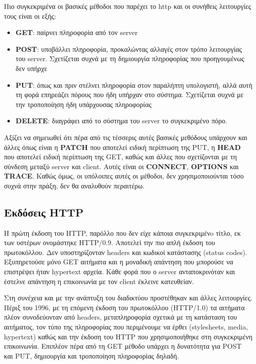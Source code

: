 Πιο συγκεκριμένα οι βασικές μέθοδοι που παρέχει το http και οι συνήθεις λειτουργίες τους είναι οι εξής:

\begin{itemize}
	\item \textbf{GET}: παίρνει πληροφορία από τον server
	\item \textbf{POST}: υποβάλλει πληροφορία, προκαλώντας αλλαγές στον τρόπο λειτουργίας του server. Σχετίζεται συχνά με τη δημιουργία πληροφορίας που προηγουμένως δεν υπήρχε 
	\item \textbf{PUT}: όπως και πριν στέλνει πληροφορία στον παραλήπτη υπολογιστή, αλλά αυτή τη φορά επηρεάζει πόρους που ήδη υπήρχαν στο σύστημα. Σχετίζεται συχνά με την τροποποίηση ήδη υπάρχουσας πληροφορίας
	\item \textbf{DELETE}: διαγράφει από το σύστημα του server το συγκεκριμένο πόρο.
\end{itemize}

Αξίζει να σημειωθεί ότι πέρα από τις τέσσερις αυτές βασικές μεθόδους υπάρχουν και άλλες όπως είναι 
η \textbf{PATCH} που αποτελεί ειδική περίπτωση της PUT, η \textbf{HEAD} που αποτελεί ειδική περίπτωση της GET,
καθώς και άλλες που σχετίζονται με τη σύνδεση μεταξύ server και client. Αυτές είναι οι \textbf{CONNECT}, \textbf{OPTIONS} και \textbf{TRACE}.
Καθώς όμως, οι υπόλοιπες αυτές οι μέθοδοι, δεν χρησιμοποιούνται τόσο συχνά στην πράξη, δεν θα αναλυθούν περαιτέρω.

\subsection{Εκδόσεις HTTP}
\label{subsec:http_versions}

Η πρώτη έκδοση του HTTP, παρόλλο που δεν είχε κάποια συγκεκριμένo τίτλο, εκ των υστέρων ονομάστηκε 
HTTP/0.9. Αποτελεί την πιο απλή έκδοση του πρωτοκόλλου. Δεν υποστηρίζονταν headers και κωδικοί κατάστασης (status codes).
Εξυπηρετούσε μόνο GET αιτήματα και η μοναδική απάντηση που μπορούσε να επιστρέψει ήταν hypertext αρχεία. Kάθε φορά που ο server ανταποκρινόταν και έστελνε
απάντηση η επικοινωνία με τον client έκλεινε κατευθείαν.

Στη συνέχεια και με την ανάπτυξη του διαδικτύου προστέθηκαν και άλλες λειτουργίες. Πέριξ του 1996,
με τη επόμενη έκδοση του πρωτοκόλλου (HTTP/1.0) τα αιτήματα πλέον συνοδεύονταν από headers, μεταπληροφορία σχετικά
με τη κατάσταση του αιτήματος, τον τύπο της πληροφορίας που περιμένουμε να έρθει (stylesheets, media, hypertext) καθώς και 
την έκδοση του HTTP που χρησιμοποιήθηκε στη συγκεκριμένη επικοινωνία. Επιπλέον πέρα από τη GET μέθοδο υπάρχει η
δυνατότητα για POST και PUT, δημιουργία και τροποποίηση πληροφορίας δηλαδή.

